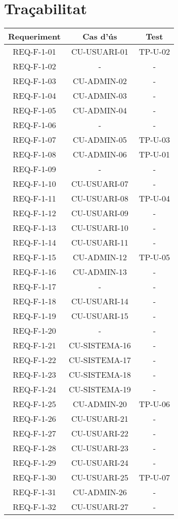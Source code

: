 \section{Traçabilitat}\label{sec:intro}

\begin{center}
\begin{tabular}{|c|c|c|}
\hline
{\cellcolor[gray]{.8} \bf Requeriment} & {\cellcolor[gray]{.8} \bf Cas d'ús} & {\cellcolor[gray]{.8} \bf Test}  \\
\hline
REQ-F-1-01 & CU-USUARI-01 & TP-U-02 \\
\hline
REQ-F-1-02 & - & - \\
\hline
REQ-F-1-03 & CU-ADMIN-02 & - \\
\hline
REQ-F-1-04 & CU-ADMIN-03 & - \\
\hline
REQ-F-1-05 & CU-ADMIN-04 & - \\
\hline
REQ-F-1-06 & - & - \\
\hline
REQ-F-1-07 & CU-ADMIN-05 & TP-U-03 \\
\hline
REQ-F-1-08 & CU-ADMIN-06 & TP-U-01 \\
\hline
REQ-F-1-09 & - & - \\
\hline
REQ-F-1-10 & CU-USUARI-07 & - \\
\hline
REQ-F-1-11 & CU-USUARI-08 & TP-U-04 \\
\hline
REQ-F-1-12 & CU-USUARI-09 & - \\
\hline
REQ-F-1-13 & CU-USUARI-10 & - \\
\hline
REQ-F-1-14 & CU-USUARI-11 & - \\
\hline
REQ-F-1-15 & CU-ADMIN-12 & TP-U-05 \\
\hline
REQ-F-1-16 & CU-ADMIN-13 & - \\
\hline
REQ-F-1-17 & - & - \\
\hline
REQ-F-1-18 & CU-USUARI-14 & - \\
\hline
REQ-F-1-19 & CU-USUARI-15 & - \\
\hline
REQ-F-1-20 & - & - \\
\hline
REQ-F-1-21 & CU-SISTEMA-16 & - \\
\hline
REQ-F-1-22 & CU-SISTEMA-17 & - \\
\hline
REQ-F-1-23 & CU-SISTEMA-18 & - \\
\hline
REQ-F-1-24 & CU-SISTEMA-19 & - \\
\hline
REQ-F-1-25 & CU-ADMIN-20 & TP-U-06 \\
\hline
REQ-F-1-26 & CU-USUARI-21 & - \\
\hline
REQ-F-1-27 & CU-USUARI-22 & - \\
\hline
REQ-F-1-28 & CU-USUARI-23 & - \\
\hline
REQ-F-1-29 & CU-USUARI-24 & - \\
\hline
REQ-F-1-30 & CU-USUARI-25 & TP-U-07 \\
\hline
REQ-F-1-31 & CU-ADMIN-26 & - \\
\hline
REQ-F-1-32 & CU-USUARI-27 & - \\
\hline

\end{tabular}
\end{center}
